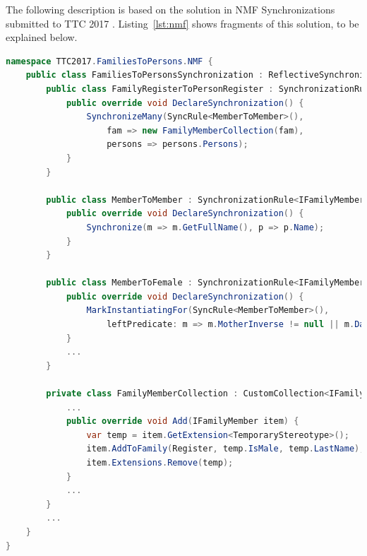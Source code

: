 
The following description is based on the solution in NMF Synchronizations submitted to TTC 2017 \cite{Hinkel2017}. Listing~\ref{lst:nmf} shows fragments of this solution, to be explained below.



\begin{lstlisting}[label={lst:nmf}, float=*t, language=cs, caption={Solution in NMF Synchronizations}]
namespace TTC2017.FamiliesToPersons.NMF {
    public class FamiliesToPersonsSynchronization : ReflectiveSynchronization {
        public class FamilyRegisterToPersonRegister : SynchronizationRule<FamilyRegister, PersonRegister> {
            public override void DeclareSynchronization() {
                SynchronizeMany(SyncRule<MemberToMember>(),
                    fam => new FamilyMemberCollection(fam),
                    persons => persons.Persons);
            }
        }

        public class MemberToMember : SynchronizationRule<IFamilyMember, IPerson> {
            public override void DeclareSynchronization() {
                Synchronize(m => m.GetFullName(), p => p.Name);
            }
        }
        
        public class MemberToFemale : SynchronizationRule<IFamilyMember, IFemale> {
            public override void DeclareSynchronization() {
                MarkInstantiatingFor(SyncRule<MemberToMember>(), 
                    leftPredicate: m => m.MotherInverse != null || m.DaughtersInverse != null);
            }
            ...
        }
        
        private class FamilyMemberCollection : CustomCollection<IFamilyMember> {
            ...
            public override void Add(IFamilyMember item) {
                var temp = item.GetExtension<TemporaryStereotype>();
                item.AddToFamily(Register, temp.IsMale, temp.LastName);
                item.Extensions.Remove(temp);
            }
            ...
        }
        ...
    }
}
\end{lstlisting} 


